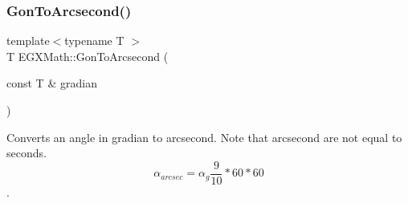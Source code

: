 \mbox{\label{group___e_g_x_math-_angle_conversions-_gon_gad4f34877c74cc444e7b741b99cd20d5a}} 
\subsubsection{\texorpdfstring{Gon\+To\+Arcsecond()}{GonToArcsecond()}}
{\footnotesize\ttfamily template$<$typename T $>$ \\
T E\+G\+X\+Math\+::\+Gon\+To\+Arcsecond (\begin{DoxyParamCaption}\item[{const T \&}]{gradian }\end{DoxyParamCaption})}



Converts an angle in gradian to arcsecond. Note that arcsecond are not equal to seconds. \[\alpha_{arcsec}=\alpha_{g}\frac{9}{10} * 60 * 60\]. 

